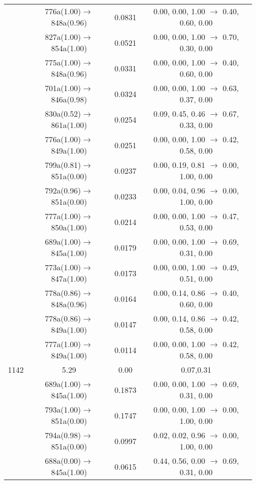 \documentclass[10pt,a4paper]{article}
\begin{document}
\begin{longtable}{c|c|c|c}
 	& 776a(1.00)$\rightarrow$848a(0.96) &	 0.0831 &	 0.00, 0.00, 1.00 $\rightarrow$ 0.40, 0.60, 0.00 \\ 
 	& 827a(1.00)$\rightarrow$854a(1.00) &	 0.0521 &	 0.00, 0.00, 1.00 $\rightarrow$ 0.70, 0.30, 0.00 \\ 
 	& 775a(1.00)$\rightarrow$848a(0.96) &	 0.0331 &	 0.00, 0.00, 1.00 $\rightarrow$ 0.40, 0.60, 0.00 \\ 
 	& 701a(1.00)$\rightarrow$846a(0.98) &	 0.0324 &	 0.00, 0.00, 1.00 $\rightarrow$ 0.63, 0.37, 0.00 \\ 
 	& 830a(0.52)$\rightarrow$861a(1.00) &	 0.0254 &	 0.09, 0.45, 0.46 $\rightarrow$ 0.67, 0.33, 0.00 \\ 
 	& 776a(1.00)$\rightarrow$849a(1.00) &	 0.0251 &	 0.00, 0.00, 1.00 $\rightarrow$ 0.42, 0.58, 0.00 \\ 
 	& 799a(0.81)$\rightarrow$851a(0.00) &	 0.0237 &	 0.00, 0.19, 0.81 $\rightarrow$ 0.00, 1.00, 0.00 \\ 
 	& 792a(0.96)$\rightarrow$851a(0.00) &	 0.0233 &	 0.00, 0.04, 0.96 $\rightarrow$ 0.00, 1.00, 0.00 \\ 
 	& 777a(1.00)$\rightarrow$850a(1.00) &	 0.0214 &	 0.00, 0.00, 1.00 $\rightarrow$ 0.47, 0.53, 0.00 \\ 
 	& 689a(1.00)$\rightarrow$845a(1.00) &	 0.0179 &	 0.00, 0.00, 1.00 $\rightarrow$ 0.69, 0.31, 0.00 \\ 
 	& 773a(1.00)$\rightarrow$847a(1.00) &	 0.0173 &	 0.00, 0.00, 1.00 $\rightarrow$ 0.49, 0.51, 0.00 \\ 
 	& 778a(0.86)$\rightarrow$848a(0.96) &	 0.0164 &	 0.00, 0.14, 0.86 $\rightarrow$ 0.40, 0.60, 0.00 \\ 
 	& 778a(0.86)$\rightarrow$849a(1.00) &	 0.0147 &	 0.00, 0.14, 0.86 $\rightarrow$ 0.42, 0.58, 0.00 \\ 
 	& 777a(1.00)$\rightarrow$849a(1.00) &	 0.0114 &	 0.00, 0.00, 1.00 $\rightarrow$ 0.42, 0.58, 0.00 \\ 
 \hline1142 &	 5.29 &	 0.00 &	 0.07,0.31 \\ 
  	& 689a(1.00)$\rightarrow$845a(1.00) &	 0.1873 &	 0.00, 0.00, 1.00 $\rightarrow$ 0.69, 0.31, 0.00 \\ 
 	& 793a(1.00)$\rightarrow$851a(0.00) &	 0.1747 &	 0.00, 0.00, 1.00 $\rightarrow$ 0.00, 1.00, 0.00 \\ 
 	& 794a(0.98)$\rightarrow$851a(0.00) &	 0.0997 &	 0.02, 0.02, 0.96 $\rightarrow$ 0.00, 1.00, 0.00 \\ 
 	& 688a(0.00)$\rightarrow$845a(1.00) &	 0.0615 &	 0.44, 0.56, 0.00 $\rightarrow$ 0.69, 0.31, 0.00 \\ 

\end{longtable}
\end{document}
